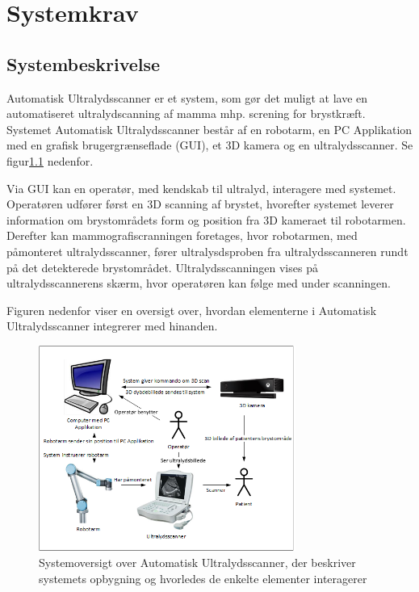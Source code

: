 \chapter{Systemkrav}\label{Systemkrav}
\section{Systembeskrivelse}
Automatisk Ultralydsscanner er et system, som gør det muligt at lave en automatiseret ultralydscanning af mamma mhp. screning for brystkræft. Systemet Automatisk Ultralydsscanner består af en robotarm, en PC Applikation med en grafisk brugergrænseflade (GUI), et 3D kamera og en ultralydsscanner. Se figur\ref{Systembeskrivelse} nedenfor. 

Via GUI kan en operatør, med kendskab til ultralyd, interagere med systemet. Operatøren udfører først en 3D scanning af brystet, hvorefter systemet leverer information om brystområdets form og position fra 3D kameraet til robotarmen. Derefter kan mammografiscranningen foretages, hvor robotarmen, med påmonteret ultralydsscanner, fører ultralysdsproben fra ultralydsscanneren rundt på det detekterede brystområdet. Ultralydsscanningen vises på ultralydsscannerens skærm, hvor operatøren kan følge med under scanningen.

Figuren nedenfor viser en oversigt over, hvordan elementerne i Automatisk Ultralydsscanner integrerer med hinanden.
 
\begin{figure}[H]
    \centering
    \includegraphics[width=0.75\textwidth]{figurer/d/Kravspecifikation/Systembeskrivelse}
    \caption{Systemoversigt over Automatisk Ultralydsscanner, der beskriver systemets opbygning og hvorledes de enkelte elementer interagerer}
    \label{Systembeskrivelse}
\end{figure}

